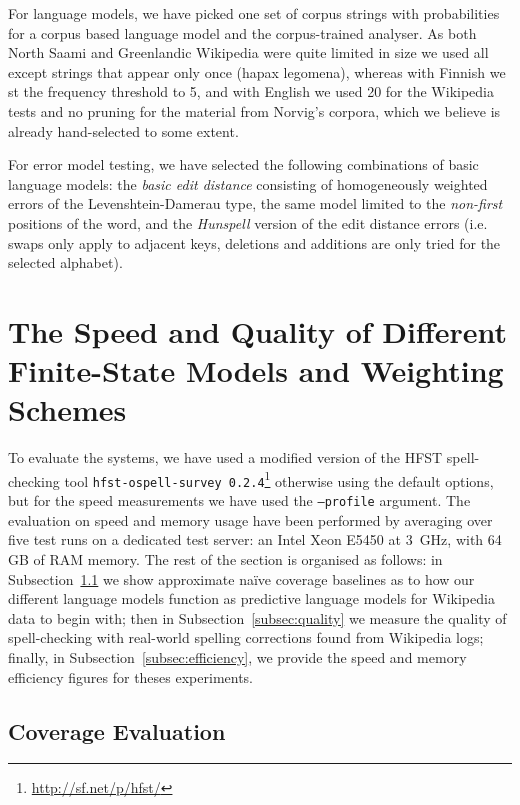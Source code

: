 \documentclass[a4paper,12pt]{article}
\begin{document}
For language models, we have picked one set of corpus strings with
probabilities for a corpus based language model and the corpus-trained
analyser. As both North Saami and Greenlandic Wikipedia were quite limited in
size we used all except strings that appear only once (hapax legomena), whereas
with Finnish we st the frequency threshold to 5, and with English we used 20 for the Wikipedia
tests and no pruning for the material from Norvig's corpora, which we believe
is already hand-selected to some extent.

For error model testing, we have selected the following combinations of basic
language models: the \emph{basic edit distance} consisting of homogeneously
weighted errors of the Levenshtein-Damerau type, the same model limited to the
\emph{non-first} positions of the word, and the \emph{Hunspell} version of the edit
distance errors (i.e. swaps only apply to adjacent keys, deletions and
additions are only tried for the selected alphabet).


\section{The Speed and Quality of Different Finite-State Models and Weighting
Schemes}
\label{sec:evaluation}

To evaluate the systems, we have used a modified version of the HFST
spell-checking tool \texttt{hfst-ospell-survey
0.2.4}\footnote{\url{http://sf.net/p/hfst/}} otherwise using the default
options, but for the speed measurements we have used the \texttt{--profile}
argument. The evaluation on speed and memory usage have been performed by
averaging over five test runs on a dedicated test server: an Intel
Xeon E5450 at 3~GHz, with 64 GB of RAM memory. The rest of the section is
organised as follows: in Subsection~\ref{subsec:coverage} we show approximate
naïve coverage baselines as to how our different language models function
as predictive language models for Wikipedia data to begin with; then
in Subsection~\ref{subsec:quality} we measure the quality of spell-checking
with real-world spelling corrections found from Wikipedia logs; finally, in
Subsection~\ref{subsec:efficiency}, we provide the speed and memory
efficiency figures for theses experiments.

\subsection{Coverage Evaluation}
\label{subsec:coverage}
\end{document}
